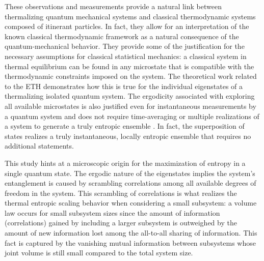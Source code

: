 These observations and measurements provide a natural link between thermalizing quantum mechanical systems and classical thermodynamic systems composed of itinerant particles. In fact, they allow for an interpretation of the known classical thermodynamic framework as a natural consequence of the quantum-mechanical behavior. They provide some of the justification for the necessary assumptions for classical statistical mechanics: a classical system in thermal equilibrium can be found in any microstate that is compatible with the thermodynamic constraints imposed on the system. The theoretical work related to the ETH demonstrates how this is true for the individual eigenstates of a thermalizing isolated quantum system. The ergodicity associated with exploring all available microstates is also justified even for instantaneous measurements by a quantum system and does not require time-averaging or multiple realizations of a system to generate a truly entropic ensemble \cite{DAlessio2016, Huang1963, Ma1985}. In fact, the superposition of states realizes a truly instantaneous, locally entropic ensemble that requires no additional statements.

This study hints at a microscopic origin for the maximization of entropy in a single quantum state. The ergodic nature of the eigenstates implies the system's entanglement is caused by scrambling correlations among all available degrees of freedom in the system. This scrambling of correlations is what realizes the thermal entropic scaling behavior when considering a small subsystem: a volume law occurs for small subsystem sizes since the amount of information (correlations) gained by including a larger subsystem is outweighed by the amount of new information lost among the all-to-all sharing of information. This fact is captured by the vanishing mutual information between subsystems whose joint volume is still small compared to the total system size.

